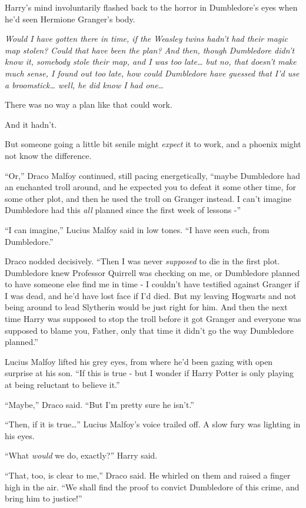 Harry's mind involuntarily flashed back to the horror in Dumbledore's
eyes when he'd seen Hermione Granger's body.

\emph{Would I have gotten there in time, if the Weasley twins hadn't had
their magic map stolen? Could that have been the plan? And then, though
Dumbledore didn't know it, somebody stole their map, and I was too
late\ldots{} but no, that doesn't make much sense, I found out too late,
how could Dumbledore have guessed that I'd use a broomstick\ldots{}
well, he did know I had one\ldots{}}

There was no way a plan like that could work.

And it hadn't.

But someone going a little bit senile might \emph{expect} it to work,
and a phoenix might not know the difference.

``Or,'' Draco Malfoy continued, still pacing energetically, ``maybe
Dumbledore had an enchanted troll around, and he expected you to defeat
it some other time, for some other plot, and then he used the troll on
Granger instead. I can't imagine Dumbledore had this \emph{all} planned
since the first week of lessons -''

``I can imagine,'' Lucius Malfoy said in low tones. ``I have seen such,
from Dumbledore.''

Draco nodded decisively. ``Then I was never \emph{supposed} to die in
the first plot. Dumbledore knew Professor Quirrell was checking on me,
or Dumbledore planned to have someone else find me in time - I couldn't
have testified against Granger if I was dead, and he'd have lost face if
I'd died. But my leaving Hogwarts and not being around to lead Slytherin
would be just right for him. And then the next time Harry was supposed
to stop the troll before it got Granger and everyone was supposed to
blame you, Father, only that time it didn't go the way Dumbledore
planned.''

Lucius Malfoy lifted his grey eyes, from where he'd been gazing with
open surprise at his son. ``If this is true - but I wonder if Harry
Potter is only playing at being reluctant to believe it.''

``Maybe,'' Draco said. ``But I'm pretty sure he isn't.''

``Then, if it is true\ldots{}'' Lucius Malfoy's voice trailed off. A
slow fury was lighting in his eyes.

``What \emph{would} we do, exactly?'' Harry said.

``That, too, is clear to me,'' Draco said. He whirled on them and raised
a finger high in the air. ``We shall find the proof to convict
Dumbledore of this crime, and bring him to justice!''

